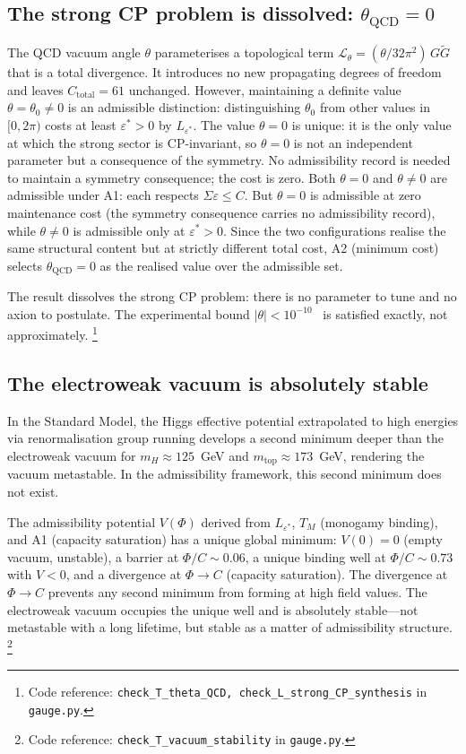 \documentclass[11pt]{article}
\newcommand{\coderef}[2]{\footnote{Code reference: \texttt{#1} in \texttt{#2}.}}
\begin{document}
\subsection{The strong CP problem is dissolved: $\theta_{\mathrm{QCD}} = 0$}
\label{sec:theta_QCD}

The QCD vacuum angle $\theta$ parameterises a topological term $\mathcal{L}_\theta = (\theta/32\pi^2)\,G\tilde{G}$ that is a total divergence.  It introduces no new propagating degrees of freedom and leaves $C_{\mathrm{total}} = 61$ unchanged.  However, maintaining a definite value $\theta = \theta_0 \ne 0$ is an admissible distinction: distinguishing $\theta_0$ from other values in $[0, 2\pi)$ costs at least $\varepsilon^* > 0$ by $L_{\varepsilon^*}$.  The value $\theta = 0$ is unique: it is the only value at which the strong sector is CP-invariant, so $\theta = 0$ is not an independent parameter but a consequence of the symmetry.  No admissibility record is needed to maintain a symmetry consequence; the cost is zero.  Both $\theta = 0$ and $\theta \ne 0$ are admissible under A1: each respects $\Sigma\varepsilon \le C$.  But $\theta = 0$ is admissible at zero maintenance cost (the symmetry consequence carries no admissibility record), while $\theta \ne 0$ is admissible only at $\varepsilon^* > 0$.  Since the two configurations realise the same structural content but at strictly different total cost, A2 (minimum cost) selects $\theta_{\mathrm{QCD}} = 0$ as the realised value over the admissible set.

The result dissolves the strong CP problem: there is no parameter to tune and no axion to postulate.  The experimental bound $|\theta| < 10^{-10}$~\cite{PDG2024} is satisfied exactly, not approximately.
\coderef{check\_T\_theta\_QCD, check\_L\_strong\_CP\_synthesis}{gauge.py}

\subsection{The electroweak vacuum is absolutely stable}
\label{sec:vacuum_stability}

In the Standard Model, the Higgs effective potential extrapolated to high energies via renormalisation group running develops a second minimum deeper than the electroweak vacuum for $m_H \approx 125$~GeV and $m_{\mathrm{top}} \approx 173$~GeV, rendering the vacuum metastable.  In the admissibility framework, this second minimum does not exist.

The admissibility potential $V(\Phi)$ derived from $L_{\varepsilon^*}$, $T_M$ (monogamy binding), and A1 (capacity saturation) has a unique global minimum: $V(0) = 0$ (empty vacuum, unstable), a barrier at $\Phi/C \sim 0.06$, a unique binding well at $\Phi/C \sim 0.73$ with $V < 0$, and a divergence at $\Phi \to C$ (capacity saturation).  The divergence at $\Phi \to C$ prevents any second minimum from forming at high field values.  The electroweak vacuum occupies the unique well and is absolutely stable---not metastable with a long lifetime, but stable as a matter of admissibility structure.
\coderef{check\_T\_vacuum\_stability}{gauge.py}
\end{document}
